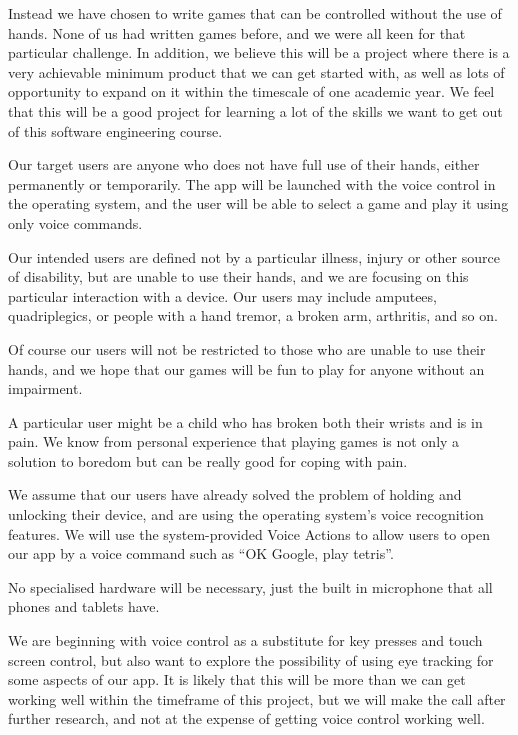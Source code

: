 \documentclass[11pt, oneside]{article}
\begin{document}
Instead we have chosen to write games that can be controlled without
the use of hands. None of us had written games before, and we were all
keen for that particular challenge. In addition, we believe this will
be a project where there is a very achievable minimum product that we
can get started with, as well as lots of opportunity to expand on it
within the timescale of one academic year. We feel that this will be a
good project for learning a lot of the skills we want to get out of
this software engineering course.

Our target users are anyone who does not have full use of their hands,
either permanently or temporarily. The app will be launched with the
voice control in the operating system, and the user will be able to
select a game and play it using only voice commands. 

Our intended users are defined not by a particular illness, injury or
other source of disability, but are unable to use their hands, and we
are focusing on this particular interaction with a device. Our users
may include amputees, quadriplegics, or people with a hand tremor, a
broken arm, arthritis, and so on.

Of course our users will not be restricted to those who are unable to use 
their hands, and we hope that our games will be fun to play for anyone 
without an impairment.

A particular user might be a child who has broken both their wrists
and is in pain. We know from personal experience that playing games
is not only a solution to boredom but can be really good for coping
with pain.

We assume that our users have already solved the problem of holding
and unlocking their device, and are using the operating system's voice
recognition features. We will use the system-provided Voice Actions to
allow users to open our app by a voice command such as ``OK Google,
play tetris''.

No specialised hardware will be necessary, just the built in
microphone that all phones and tablets have.


We are beginning with voice control as a substitute for key presses
and touch screen control, but also want to explore the possibility of
using eye tracking for some aspects of our app. It is likely that this
will be more than we can get working well within the timeframe of this
project, but we will make the call after further research, and not at
the expense of getting voice control working well.
\end{document}
